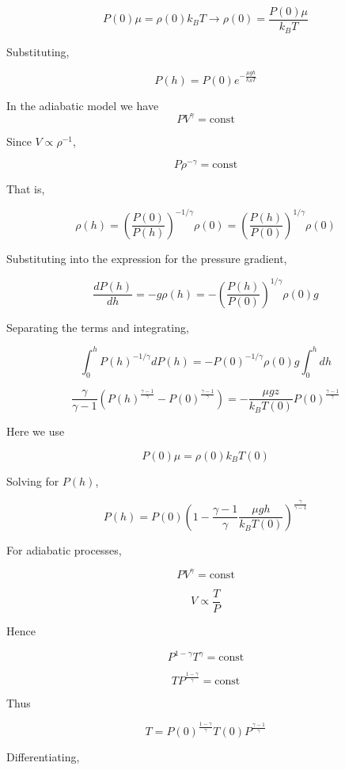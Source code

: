 \documentclass[11pt]{article}
\begin{document}
\begin{pproblem}
\begin{pssolution*}{}{}
\begin{alternativas}
        \[P(0)\mu = \rho(0)k_B T \rightarrow \rho(0) = \frac{P(0)\mu}{k_BT}\]

        Substituting,

        \[\boxed{P(h) = P(0)e^{-\frac{\mu g h}{k_BT}}}\]

        \item In the adiabatic model we have
        \[PV^\gamma = \mathrm{const}\]

        Since \(V\propto \rho^{-1}\),

        \[P\rho^{-\gamma} = \mathrm{const}\]

        That is,

        \[\rho(h) = \left(\frac{P(0)}{P(h)}\right)^{-1/\gamma}\rho(0) = \left(\frac{P(h)}{P(0)}\right)^{1/\gamma}\rho(0)\]

        Substituting into the expression for the pressure gradient,

        \[\frac{dP(h)}{dh} = -g\rho(h) = -\left(\frac{P(h)}{P(0)}\right)^{1/\gamma}\rho(0)g\]

        Separating the terms and integrating,

        \[\int_0^h P(h)^{-1/\gamma}dP(h) = -P(0)^{-1/\gamma}\rho(0)g\int_0^h dh\]

        \[\frac{\gamma}{\gamma-1}(P(h)^{\frac{\gamma-1}{\gamma}}-P(0)^{\frac{\gamma-1}{\gamma}}) = -\frac{\mu g z}{k_B T(0)}P(0)^{\frac{\gamma-1}{\gamma}}\]

        Here we use

        \[P(0)\mu = \rho(0)k_B T(0)\]

        Solving for \(P(h)\),
    
        \[\boxed{P(h) = P(0)\left(1-\frac{\gamma-1}{\gamma}\frac{\mu g h}{k_B T(0)}\right)^{\frac{\gamma}{\gamma-1}}}\]
       
        \item For adiabatic processes,
        
        \[PV^\gamma = \mathrm{const}\]

        \[V\propto \frac{T}{P}\]

        Hence

        \[P^{1-\gamma} T^\gamma = \mathrm{const}\]

        \[T P^\frac{1-\gamma}{\gamma} = \mathrm{const}\]
        
        Thus

        \[T = P(0)^\frac{1-\gamma}{\gamma}T(0)P^{\frac{\gamma-1}{\gamma}}\]

        Differentiating,


\end{alternativas}
\end{pssolution*}
\end{pproblem}
\end{document}
